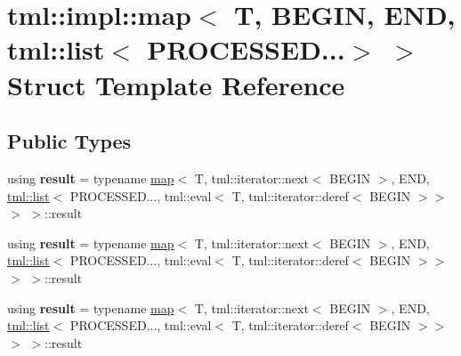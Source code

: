 \hypertarget{structtml_1_1impl_1_1map_3_01T_00_01BEGIN_00_01END_00_01tml_1_1list_3_01PROCESSED_8_8_8_4_01_4}{\section{tml\+:\+:impl\+:\+:map$<$ T, B\+E\+G\+I\+N, E\+N\+D, tml\+:\+:list$<$ P\+R\+O\+C\+E\+S\+S\+E\+D...$>$ $>$ Struct Template Reference}
\label{structtml_1_1impl_1_1map_3_01T_00_01BEGIN_00_01END_00_01tml_1_1list_3_01PROCESSED_8_8_8_4_01_4}
}
\subsection*{Public Types}
\begin{DoxyCompactItemize}
\item 
\hypertarget{structtml_1_1impl_1_1map_3_01T_00_01BEGIN_00_01END_00_01tml_1_1list_3_01PROCESSED_8_8_8_4_01_4_aae8d6a098963e5e1bdc4121f7bc8e69b}{using {\bfseries result} = typename \hyperlink{structtml_1_1impl_1_1map}{map}$<$ T, tml\+::iterator\+::next$<$ B\+E\+G\+I\+N $>$, E\+N\+D, \hyperlink{structtml_1_1list}{tml\+::list}$<$ P\+R\+O\+C\+E\+S\+S\+E\+D..., tml\+::eval$<$ T, tml\+::iterator\+::deref$<$ B\+E\+G\+I\+N $>$$>$$>$ $>$\+::result}\label{structtml_1_1impl_1_1map_3_01T_00_01BEGIN_00_01END_00_01tml_1_1list_3_01PROCESSED_8_8_8_4_01_4_aae8d6a098963e5e1bdc4121f7bc8e69b}

\item 
\hypertarget{structtml_1_1impl_1_1map_3_01T_00_01BEGIN_00_01END_00_01tml_1_1list_3_01PROCESSED_8_8_8_4_01_4_aae8d6a098963e5e1bdc4121f7bc8e69b}{using {\bfseries result} = typename \hyperlink{structtml_1_1impl_1_1map}{map}$<$ T, tml\+::iterator\+::next$<$ B\+E\+G\+I\+N $>$, E\+N\+D, \hyperlink{structtml_1_1list}{tml\+::list}$<$ P\+R\+O\+C\+E\+S\+S\+E\+D..., tml\+::eval$<$ T, tml\+::iterator\+::deref$<$ B\+E\+G\+I\+N $>$$>$$>$ $>$\+::result}\label{structtml_1_1impl_1_1map_3_01T_00_01BEGIN_00_01END_00_01tml_1_1list_3_01PROCESSED_8_8_8_4_01_4_aae8d6a098963e5e1bdc4121f7bc8e69b}

\item 
\hypertarget{structtml_1_1impl_1_1map_3_01T_00_01BEGIN_00_01END_00_01tml_1_1list_3_01PROCESSED_8_8_8_4_01_4_aae8d6a098963e5e1bdc4121f7bc8e69b}{using {\bfseries result} = typename \hyperlink{structtml_1_1impl_1_1map}{map}$<$ T, tml\+::iterator\+::next$<$ B\+E\+G\+I\+N $>$, E\+N\+D, \hyperlink{structtml_1_1list}{tml\+::list}$<$ P\+R\+O\+C\+E\+S\+S\+E\+D..., tml\+::eval$<$ T, tml\+::iterator\+::deref$<$ B\+E\+G\+I\+N $>$$>$$>$ $>$\+::result}\label{structtml_1_1impl_1_1map_3_01T_00_01BEGIN_00_01END_00_01tml_1_1list_3_01PROCESSED_8_8_8_4_01_4_aae8d6a098963e5e1bdc4121f7bc8e69b}

\end{DoxyCompactItemize}
